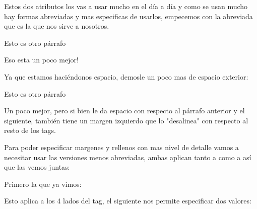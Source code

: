 \documentclass[letterpaper,10pt,spanish]{sphinxmanual}
\begin{document}
Estos dos atributos los vas a usar mucho en el día a día y como se usan mucho
hay formas abreviadas y mas especificas de usarlos, empecemos con la abreviada
que es la que nos sirve a nosotros.

%
\begin{sphinxVerbatim}[commandchars=\\\{\}]
 Esto es otro párrafo
\end{sphinxVerbatim}

Eso esta un poco mejor!

Ya que estamos haciéndonos espacio, demosle un poco mas de espacio exterior:

%
\begin{sphinxVerbatim}[commandchars=\\\{\}]
 Esto es otro párrafo
\end{sphinxVerbatim}

Un poco mejor, pero si bien le da espacio con respecto al párrafo anterior y el
siguiente, también tiene un margen izquierdo que lo "desalinea" con respecto
al resto de los tags.

Para poder especificar margenes y rellenos con mas nivel de detalle vamos a
necesitar usar las versiones menos abreviadas, ambas aplican tanto a 
como a  así que las vemos juntas:

Primero la que ya vimos:

%
\begin{sphinxVerbatim}[commandchars=\\\{\}]
 
 
\end{sphinxVerbatim}

Esto aplica a los 4 lados del tag, el siguiente nos permite especificar dos
valores:

%
\begin{sphinxVerbatim}[commandchars=\\\{\}]
  
  
\end{sphinxVerbatim}
\end{document}
